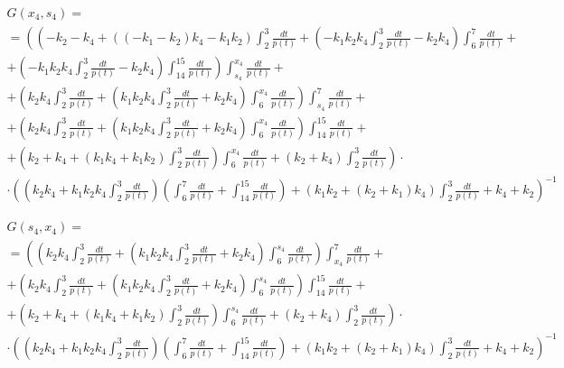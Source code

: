 \documentclass[a4paper,12pt]{article} %
\begin{document}
\begin{multline}
	G(x_4,s_4)=\\=
	\left(
		\left(
			-k_2-k_4+\left( \left( -k_1-k_2\right)  k_4-k_1 k_2\right)  \int_{2}^{3}\frac{dt}{p(t)}+
			\left( -k_1 k_2 k_4 \int_{2}^{3}\frac{dt}{p(t)}-k_2 k_4\right)  \int_{6}^{7}\frac{dt}{p(t)}
			\right. \right. + \\ + \left. \left.
			\left( -k_1 k_2 k_4 \int_{2}^{3}\frac{dt}{p(t)}-k_2 k_4\right)  \int_{14}^{15}\frac{dt}{p(t)}
		\right)
		\int_{s_4}^{x_4}\frac{dt}{p(t)}
		\right. + \\ + \left.
		\left( k_2 k_4 \int_{2}^{3}\frac{dt}{p(t)}+\left( k_1 k_2 k_4 \int_{2}^{3}\frac{dt}{p(t)}+
		k_2 k_4\right)  \int_{6}^{x_4}\frac{dt}{p(t)}\right)  \int_{s_4}^{7}\frac{dt}{p(t)}
		\right. + \\ + \left.
		\left( k_2 k_4 \int_{2}^{3}\frac{dt}{p(t)}+
		\left( k_1 k_2 k_4 \int_{2}^{3}\frac{dt}{p(t)}+
		k_2 k_4\right)  \int_{6}^{x_4}\frac{dt}{p(t)}\right)  \int_{14}^{15}\frac{dt}{p(t)}
		\right. + \\ + \left.
		\left( k_2+k_4+\left( k_1 k_4+k_1 k_2\right)  \int_{2}^{3}\frac{dt}{p(t)}\right)  \int_{6}^{x_4}\frac{dt}{p(t)}+\left( k_2+k_4\right)  \int_{2}^{3}\frac{dt}{p(t)}
	\right) \cdot \\ \cdot \left(
		\left( k_2 k_4+k_1 k_2 k_4 \int_{2}^{3}\frac{dt}{p(t)}\right)
		\left( \int_{6}^{7}\frac{dt}{p(t)}+ \int_{14}^{15}\frac{dt}{p(t)} \right)+
		\left( k_1 k_2+\left( k_2+k_1\right)  k_4\right)  \int_{2}^{3}\frac{dt}{p(t)}+k_4+k_2
	\right)^{-1}
\end{multline}

\begin{multline}
	G(s_4,x_4)=\\=
	\left(
		\left( k_2 k_4 \int_{2}^{3}\frac{dt}{p(t)}+
		\left( k_1 k_2 k_4 \int_{2}^{3}\frac{dt}{p(t)}+
		k_2 k_4\right)  \int_{6}^{s_4}\frac{dt}{p(t)}\right)  \int_{x_4}^{7}\frac{dt}{p(t)}
		\right. + \\ + \left.
		\left( k_2 k_4 \int_{2}^{3}\frac{dt}{p(t)}+
		\left( k_1 k_2 k_4 \int_{2}^{3}\frac{dt}{p(t)}+
		k_2 k_4\right)  \int_{6}^{s_4}\frac{dt}{p(t)}\right)  \int_{14}^{15}\frac{dt}{p(t)}
		\right. + \\ + \left.
		\left( k_2+k_4+\left( k_1 k_4+k_1 k_2\right)  \int_{2}^{3}\frac{dt}{p(t)}\right)  \int_{6}^{s_4}\frac{dt}{p(t)}+\left( k_2+k_4\right)  \int_{2}^{3}\frac{dt}{p(t)}
	\right) \cdot \\ \cdot \left(
		\left( k_2 k_4+k_1 k_2 k_4 \int_{2}^{3}\frac{dt}{p(t)}\right)
		\left( \int_{6}^{7}\frac{dt}{p(t)}+ \int_{14}^{15}\frac{dt}{p(t)} \right)+
		\left( k_1 k_2+\left( k_2+k_1\right)  k_4\right)  \int_{2}^{3}\frac{dt}{p(t)}+k_4+k_2
	\right)^{-1}
\end{multline}
\end{document}
